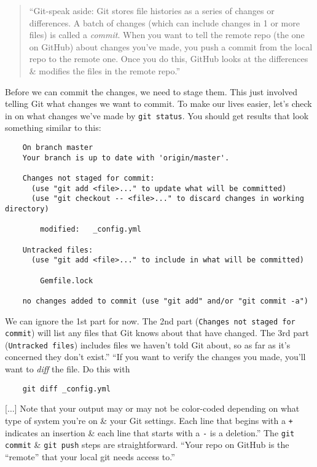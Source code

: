 \documentclass{article}
\numberwithin{equation}{section}
\begin{document}
\begin{quotation}
	``Git-speak aside: Git stores file histories as a series of changes or differences. A batch of changes (which can include changes in 1 or more files) is called a \emph{commit}. When you want to tell the remote repo (the one on GitHub) about changes you've made, you push a commit from the local repo to the remote one. Once you do this, GitHub looks at the differences \& modifies the files in the remote repo.''
\end{quotation}
Before we can commit the changes, we need to stage them. This just involved telling Git what changes we want to commit. To make our lives easier, let's check in on what changes we've made by \texttt{git status}. You should get results that look something similar to this:
\begin{verbatim}
	On branch master
	Your branch is up to date with 'origin/master'.
	
	Changes not staged for commit:
	  (use "git add <file>..." to update what will be committed)
	  (use "git checkout -- <file>..." to discard changes in working directory)
	
		modified:   _config.yml
	
	Untracked files:
	  (use "git add <file>..." to include in what will be committed)
	
		Gemfile.lock
	
	no changes added to commit (use "git add" and/or "git commit -a")
\end{verbatim}
We can ignore the 1st part for now. The 2nd part (\texttt{Changes not staged for commit}) will list any files that Git knows about that have changed. The 3rd part (\texttt{Untracked files}) includes files we haven't told Git about, so as far as it's concerned they don't exist.'' ``If you want to verify the changes you made, you'll want to \textit{diff} the file. Do this with
\begin{verbatim}
	git diff _config.yml
\end{verbatim}
[$\ldots$] Note that your output may or may not be color-coded depending on what type of system you're on \& your Git settings. Each line that begins with a \texttt{+} indicates an insertion \& each line that starts with a \texttt{-} is a deletion.'' The \texttt{git commit} \& \texttt{git push} steps are straightforward. ``Your repo on GitHub is the ``remote'' that your local git needs access to.''
\end{document}

